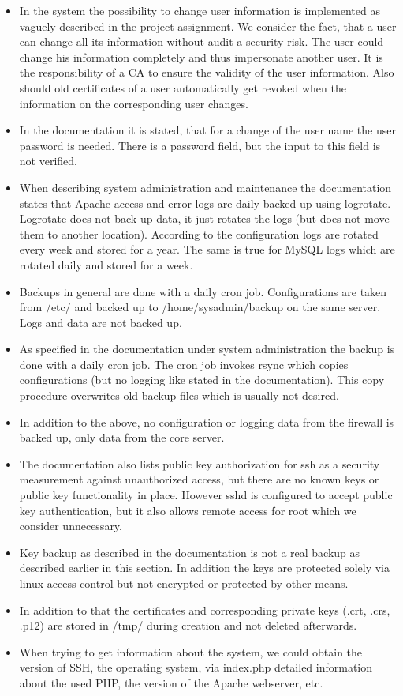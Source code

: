 \documentclass{report}
\begin{document}
\begin{itemize}
\item In the system the possibility to change user information is implemented as vaguely described in the project assignment. We consider the fact, that a user can change all its information without audit a security risk. The user could change his information completely and thus impersonate another user. It is the responsibility of a CA to ensure the validity of the user information. Also should old certificates of a user automatically get revoked when the information on the corresponding user changes.
\item In the documentation it is stated, that for a change of the user name the user password is needed. There is a password field, but the input to this field is not verified.
\item When describing system administration and maintenance the documentation states that Apache access and error logs are daily backed up using logrotate. Logrotate does not back up data, it just rotates the logs (but does not move them to another location). According to the configuration logs are rotated every week and stored for a year. The same is true for MySQL logs which are rotated daily and stored for a week.
\item Backups in general are done with a daily cron job. Configurations are taken from /etc/ and backed up to /home/sysadmin/backup on the same server. Logs and data are not backed up. 
\item As specified in the documentation under system administration the backup is done with a daily cron job. The cron job invokes rsync which copies configurations (but no logging like stated in the documentation). This copy procedure overwrites old backup files which is usually not desired.
\item In addition to the above, no configuration or logging data from the firewall is backed up, only data from the core server.
\item The documentation also lists public key authorization for ssh as a security measurement against unauthorized access, but there are no known keys or public key functionality in place. However sshd is configured to accept public key authentication, but it also allows remote access for root which we consider unnecessary.
\item Key backup as described in the documentation is not a real backup as described earlier in this section. In addition the keys are protected solely via linux access control but not encrypted or protected by other means.
\item In addition to that the certificates and corresponding private keys (.crt, .crs, .p12) are stored in /tmp/ during creation and not deleted afterwards. 
\item When trying to get information about the system, we could obtain the version of SSH, the operating system, via index.php detailed information about the used PHP, the version of the Apache webserver, etc.
\end{itemize}
\end{document}
